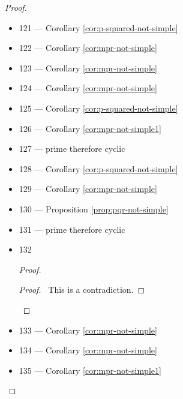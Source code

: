 \begin{proof}
\begin{itemize}
\begin{proof}
	\pf
	\qedstep
	\begin{proof}
		\pf\ This is a contradiction by inspection of the list of subgroups of $A_6$.
	\end{proof}
\end{proof}
\item 121 --- Corollary \ref{cor:p-squared-not-simple}
\item 122 --- Corollary \ref{cor:mpr-not-simple}
\item 123 --- Corollary \ref{cor:mpr-not-simple}
\item 124 --- Corollary \ref{cor:mpr-not-simple}
\item 125 --- Corollary \ref{cor:p-squared-not-simple}
\item 126 --- Corollary \ref{cor:mpr-not-simple1}
\item 127 --- prime therefore cyclic
\item 128 --- Corollary \ref{cor:p-squared-not-simple}
\item 129 --- Corollary \ref{cor:mpr-not-simple}
\item 130 --- Proposition \ref{prop:pqr-not-simple}
\item 131 --- prime therefore cyclic
\item 132
\begin{proof}
\qedstep
\begin{proof}
	\pf\ This is a contradiction.
\end{proof}
\end{proof}
\item 133 --- Corollary \ref{cor:mpr-not-simple}
\item 134 --- Corollary \ref{cor:mpr-not-simple}
\item 135 --- Corollary \ref{cor:mpr-not-simple1}

\end{itemize}
\end{proof}

